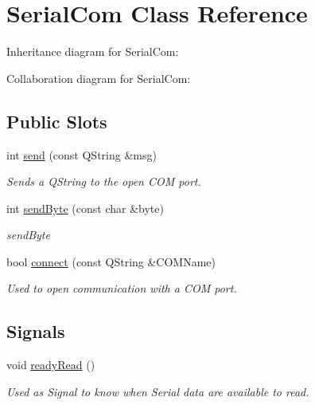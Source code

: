 \hypertarget{classSerialCom}{}\section{Serial\+Com Class Reference}
\label{classSerialCom}


Inheritance diagram for Serial\+Com\+:


Collaboration diagram for Serial\+Com\+:
\subsection*{Public Slots}
\begin{DoxyCompactItemize}
\item 
int \hyperlink{classSerialCom_a7239ab9610d097a8f2dabfbb125eccc6}{send} (const Q\+String \&msg)
\begin{DoxyCompactList}\small\item\em Sends a Q\+String to the open C\+OM port. \end{DoxyCompactList}\item 
int \hyperlink{classSerialCom_ab4428cc25df9b3d7e3903a74ae52b30b}{send\+Byte} (const char \&byte)
\begin{DoxyCompactList}\small\item\em send\+Byte \end{DoxyCompactList}\item 
bool \hyperlink{classSerialCom_a7a89d87e537831c46dccbd4f1c06d70c}{connect} (const Q\+String \&C\+O\+M\+Name)
\begin{DoxyCompactList}\small\item\em Used to open communication with a C\+OM port. \end{DoxyCompactList}\end{DoxyCompactItemize}
\subsection*{Signals}
\begin{DoxyCompactItemize}
\item 
\mbox{\label{classSerialCom_a677069983c113dcc01cdbd43c1ad9a71}} 
void \hyperlink{classSerialCom_a677069983c113dcc01cdbd43c1ad9a71}{ready\+Read} ()
\begin{DoxyCompactList}\small\item\em Used as Signal to know when Serial data are available to read. \end{DoxyCompactList}\end{DoxyCompactItemize}
